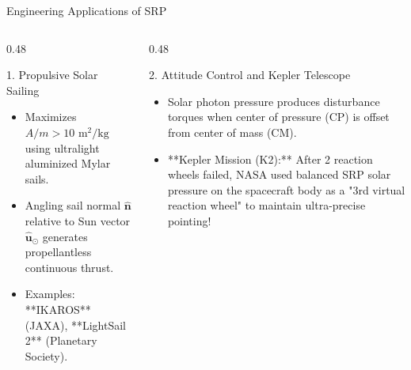 \documentclass[aspectratio=169,11pt]{beamer}
\begin{document}
\begin{frame}{Engineering Applications of SRP}
    \begin{columns}[t]
        \begin{column}{0.48\textwidth}
            \begin{exampleblock}{1. Propulsive Solar Sailing}
                \begin{itemize}
                    \item Maximizes $A/m > 10\text{ m}^2/\text{kg}$ using ultralight aluminized Mylar sails.
                    \item Angling sail normal $\hat{\mathbf{n}}$ relative to Sun vector $\hat{\mathbf{u}}_{\odot}$ generates propellantless continuous thrust.
                    \item Examples: **IKAROS** (JAXA), **LightSail 2** (Planetary Society).
                \end{itemize}
            \end{exampleblock}
        \end{column}

        \begin{column}{0.48\textwidth}
            \begin{exampleblock}{2. Attitude Control and Kepler Telescope}
                \begin{itemize}
                    \item Solar photon pressure produces disturbance torques when center of pressure (CP) is offset from center of mass (CM).
                    \item **Kepler Mission (K2):** After 2 reaction wheels failed, NASA used balanced SRP solar pressure on the spacecraft body as a "3rd virtual reaction wheel" to maintain ultra-precise pointing!
                \end{itemize}
            \end{exampleblock}
        \end{column}
    \end{columns}
\end{frame}
\end{document}
